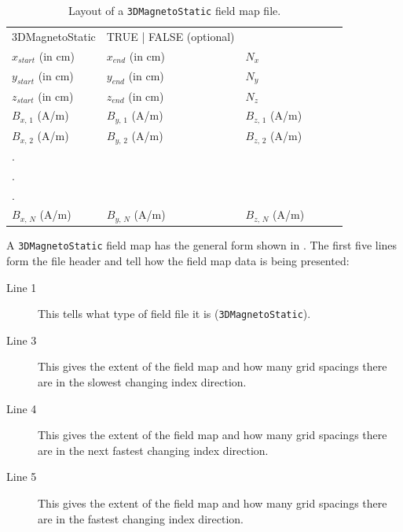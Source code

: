 \begin{table}[ht!]
    \caption{Layout of a \texttt{3DMagnetoStatic} field map file.}
    \label{tab:3DMagnetoStatic}
    \begin{center}
    \begin{tabular}{llllll}
      \hline
      3DMagnetoStatic     & TRUE | FALSE (optional) &                   \\
      $x_{start}$ (in cm) & $x_{end}$ (in cm) & $N_{x}$           \\
      $y_{start}$ (in cm) & $y_{end}$ (in cm) & $N_{y}$           \\
      $z_{start}$ (in cm) & $z_{end}$ (in cm) & $N_{z}$           \\
      $B_{x,\,1}$ (A/m)   & $B_{y,\,1}$ (A/m) & $B_{z,\,1}$ (A/m) \\
      $B_{x,\,2}$ (A/m)   & $B_{y,\,2}$ (A/m) & $B_{z,\,2}$ (A/m) \\
      .                   &                   &                   \\
      .                   &                   &                   \\
      .                   &                   &                   \\
      $B_{x,\,N}$ (A/m)   & $B_{y,\,N}$ (A/m) & $B_{z,\,N}$ (A/m) \\
      \hline
    \end{tabular}
    \end{center}
\end{table}

A \texttt{3DMagnetoStatic} field map has the general form shown in . The first five lines form
the file header and tell \opalt how the field map data is being presented:

\begin{description}
\item[Line 1] This tells \opalt what type of field file it is (\texttt{3DMagnetoStatic}).
\item[Line 3] This gives the extent of the field map and how many grid spacings there are in the slowest changing
  index direction.
\item[Line 4] This gives the extent of the field map and how many grid spacings there are in the next fastest changing
  index direction.
\item[Line 5] This gives the extent of the field map and how many grid spacings there are in the fastest changing
  index direction.
\end{description}

